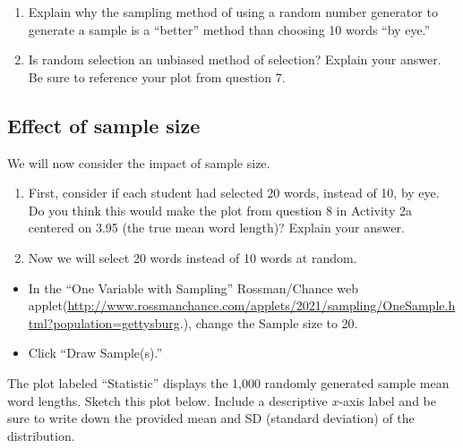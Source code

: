 \documentclass[
]{report}
\begin{document}
\newpage

\begin{enumerate}
\def\labelenumi{\arabic{enumi}.}
\setcounter{enumi}{8}
\item
  Explain why the sampling method of using a random number generator to generate a sample is a ``better'' method than choosing 10 words ``by eye.''
  \vspace{0.8in}
\item
  Is random selection an unbiased method of selection? Explain your answer. Be sure to reference your plot from question 7.
  \vspace{0.5in}
\end{enumerate}

\hypertarget{effect-of-sample-size}{%
\subsection*{Effect of sample size}\label{effect-of-sample-size}}

We will now consider the impact of sample size.

\begin{enumerate}
\def\labelenumi{\arabic{enumi}.}
\setcounter{enumi}{10}
\item
  First, consider if each student had selected 20 words, instead of 10, by eye. Do you think this would make the plot from question 8 in Activity 2a centered on 3.95 (the true mean word length)? Explain your answer.
  \vspace{0.4in}
\item
  Now we will select 20 words instead of 10 words at random.
\end{enumerate}

\begin{itemize}
\item
  In the ``One Variable with Sampling'' Rossman/Chance web applet(\url{http://www.rossmanchance.com/applets/2021/sampling/OneSample.html?population=gettysburg}.), change the Sample size to 20.
\item
  Click ``Draw Sample(s).''
\end{itemize}

The plot labeled ``Statistic'' displays the 1,000 randomly generated sample mean word lengths. Sketch this plot below. Include a descriptive \(x\)-axis label and be sure to write down the provided mean and SD (standard deviation) of the distribution.
\vspace{1.6in}
\end{document}
